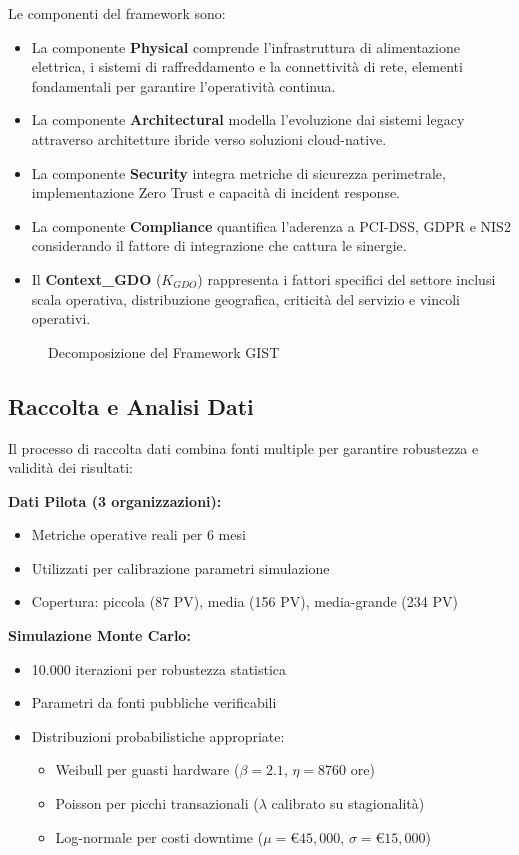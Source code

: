 Le componenti del framework sono:
\begin{itemize}
\item La componente \textbf{Physical} comprende l'infrastruttura di alimentazione elettrica, i sistemi di raffreddamento e la connettività di rete, elementi fondamentali per garantire l'operatività continua.
\item La componente \textbf{Architectural} modella l'evoluzione dai sistemi legacy attraverso architetture ibride verso soluzioni cloud-native.
\item La componente \textbf{Security} integra metriche di sicurezza perimetrale, implementazione Zero Trust e capacità di incident response.
\item La componente \textbf{Compliance} quantifica l'aderenza a PCI-DSS, GDPR e NIS2 considerando il fattore di integrazione che cattura le sinergie.
\item Il \textbf{Context\_GDO} ($K_{GDO}$) rappresenta i fattori specifici del settore inclusi scala operativa, distribuzione geografica, criticità del servizio e vincoli operativi.
\end{itemize}

\begin{figure}[H]
\centering
{}
\caption{Decomposizione del Framework GIST}
\end{figure}

\subsection{Raccolta e Analisi Dati}

Il processo di raccolta dati combina fonti multiple per garantire robustezza e validità dei risultati:

\textbf{Dati Pilota (3 organizzazioni):}
\begin{itemize}
\item Metriche operative reali per 6 mesi
\item Utilizzati per calibrazione parametri simulazione
\item Copertura: piccola (87 PV), media (156 PV), media-grande (234 PV)
\end{itemize}

\textbf{Simulazione Monte Carlo:}
\begin{itemize}
\item 10.000 iterazioni per robustezza statistica
\item Parametri da fonti pubbliche verificabili
\item Distribuzioni probabilistiche appropriate:
\begin{itemize}
\item Weibull per guasti hardware ($\beta=2.1$, $\eta=8760$ ore)
\item Poisson per picchi transazionali ($\lambda$ calibrato su stagionalità)
\item Log-normale per costi downtime ($\mu=€45,000$, $\sigma=€15,000$)
\end{itemize}
\end{itemize}

